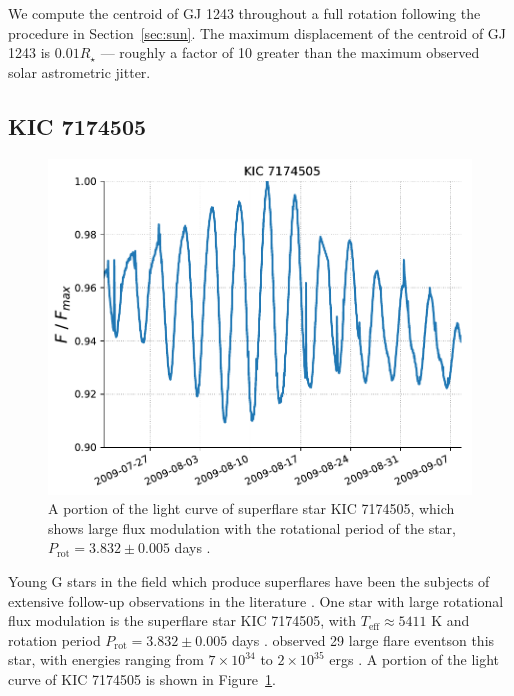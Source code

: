 We compute the centroid of GJ 1243 throughout a full rotation following the procedure in Section~\ref{sec:sun}. The maximum displacement of the centroid of GJ 1243 is $0.01 R_\star$ --- roughly a factor of 10 greater than the maximum observed solar astrometric jitter. 

\subsection{KIC 7174505} \label{sec:superflarestar}

\begin{figure}
\begin{center}
\includegraphics[scale=0.5]{gaia/KIC7174505_lightcurve.pdf}
\end{center}
\caption{A portion of the \kepler light curve of superflare star KIC 7174505, which shows large flux modulation with the rotational period of the star,  $P_{\mathrm{rot}} = 3.832 \pm 0.005$ days \citep{McQuillan2014}.} \label{fig:kic}
\end{figure}

Young G stars in the \kepler field which produce superflares have been the subjects of extensive follow-up observations in the literature \citep[see e.g.:][]{Maehara2012, Maehara2017, Karoff2016, Notsu2013, Notsu2015a, Notsu2015b}. One star with large rotational flux modulation is the superflare star KIC 7174505, with $T_{\mathrm{eff}} \approx 5411$ K and rotation period $P_{\mathrm{rot}} = 3.832 \pm 0.005$ days \citep{Mathur2017, McQuillan2014}. \kepler observed 29 large flare eventson this star, with energies ranging from $7\times10^{34}$ to $2 \times10^{35}$ ergs \citep{Shibayama2013}. A portion of the \kepler light curve of KIC 7174505 is shown in Figure~\ref{fig:kic}.

